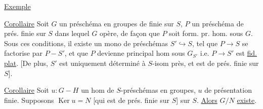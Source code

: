 \uline{Exemple}

\uline{Corollaire} Soit $G$ un préschéma en groupes de   finie sur $S$,  $P$ un  préschéma de prés. finie sur $S$ dans lequel $G$ opère, de façon que $P$ soit form. pr. hom. sous $G$. Sous ces conditions, il existe un mono de préschémas $S'\hookrightarrow S$, tel que $P\longrightarrow S$ se factorise par $P-S'$, et que  $P$ devienne  principal hom sous $G_{S'}$ i.e. $P\longrightarrow S'$ est  \uline{fid.} \uline{plat}. [De  plus, $S'$ est uniquement déterminé à $S$-isom près, et est de prés. finie sur $S$].

\uline{Corollaire} Soit $u:G-H$ un hom de $S$-préschémas en groupes,  $u$ de présentation finie. Supposons $\operatorname{Ker}u=N$ [qui est de prés. finie sur $S$]  sur $S$. \uline{Alors}  $G/N$ \uline{existe}.
